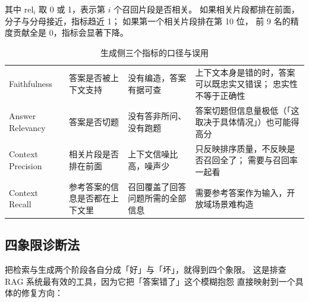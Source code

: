 其中 $\text{rel}_i$ 取 0 或 1，表示第 $i$ 个召回片段是否相关。
如果相关片段都排在前面，分子与分母接近，指标趋近 1；
如果第一个相关片段排在第 10 位，
前 9 名的精度贡献全是 0，指标会显著下降。

\begin{table}[htbp]
\centering
\caption{生成侧三个指标的口径与误用}
\label{tab:rag-metrics}
\small
\begin{tabularx}{\textwidth}{L{2.3cm} L{3.5cm} L{3.4cm} Y}
\toprule
{} &  &  &  \\
\midrule
Faithfulness & 答案是否被上下文支持 &
没有编造，答案有据可查 &
上下文本身是错的时，答案可以既忠实又错误；
忠实性不等于正确性 \\
\addlinespace
Answer Relevancy & 答案是否切题 &
没有答非所问、没有跑题 &
答案切题但信息量极低（「这取决于具体情况」）也可能得高分 \\
\addlinespace
Context Precision & 相关片段是否排在前面 &
上下文信噪比高，噪声少 &
只反映排序质量，不反映是否召回全了；
需要与召回率一起看 \\
\addlinespace
Context Recall & 参考答案的信息是否都在上下文里 &
召回覆盖了回答问题所需的全部信息 &
需要参考答案作为输入，开放域场景难构造 \\
\bottomrule
\end{tabularx}
\end{table}

\subsection{四象限诊断法}

把检索与生成两个阶段各自分成「好」与「坏」，就得到四个象限。
这是排查 RAG 系统最有效的工具，因为它把「答案错了」这个模糊抱怨
直接映射到一个具体的修复方向：

